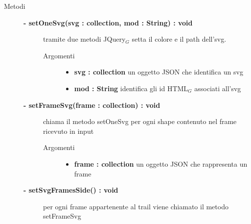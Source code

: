 \begin{description}
	
\item[Metodi] \hfill

	\begin{description}
		\item[\textbf{\color{blue}- setOneSvg(svg : collection, mod : String) : void			}] \hfill
		tramite due metodi JQuery$_G$ setta il colore e il path dell'svg.		
			
		\begin{description}
			\item[Argomenti] \hfill
				\begin{itemize}
				
					\item \textbf{svg : collection			} \hfill
						un oggetto JSON che identifica un svg
					\item \textbf{mod : String			} \hfill
						identifica gli id HTML$_G$ associati all'svg
				\end{itemize}
		\end{description}
	\end{description}

	\begin{description}
		\item[\textbf{\color{blue}- setFrameSvg(frame : collection) : void			}] \hfill
			chiama il metodo setOneSvg per ogni shape contenuto nel frame ricevuto in input	
			
		\begin{description}
			\item[Argomenti] \hfill
				\begin{itemize}
				
					\item \textbf{frame : collection			} \hfill
						un oggetto JSON che rappresenta un frame
				\end{itemize}
		\end{description}
	\end{description}
	
	\begin{description}
		\item[\textbf{\color{blue}- setSvgFramesSide() : void			}] \hfill
			per ogni frame appartenente al trail viene chiamato il metodo setFrameSvg	
			
	\end{description}
	

\end{description}
